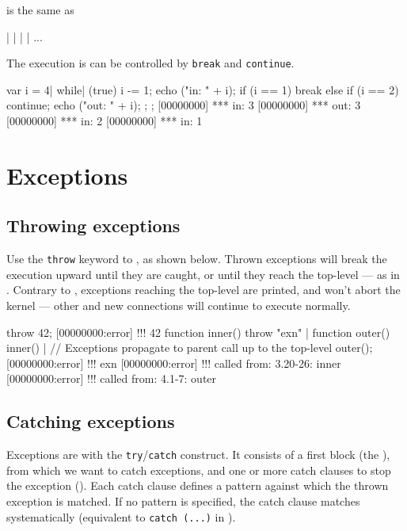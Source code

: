 \noindent
is the same as

\begin{urbiunchecked}
 |  |  |  | ...
\end{urbiunchecked}

The execution is can be controlled by \lstinline|break| and
\lstinline|continue|.

\begin{urbiscript}
{
  var i = 4|
  while| (true)
  {
    i -= 1;
    echo ("in: " + i);
    if (i == 1)
      break
    else if (i == 2)
      continue;
    echo ("out: " + i);
  };
};
[00000000] *** in: 3
[00000000] *** out: 3
[00000000] *** in: 2
[00000000] *** in: 1
\end{urbiscript}


\section{Exceptions}
\label{sec:lang:except}
\subsection{Throwing exceptions}

Use the \lstinline|throw| keyword to , as shown below. Thrown exceptions will
break the execution upward until they are caught, or until they reach
the top-level --- as in \Cxx.  Contrary to \Cxx, exceptions reaching
the top-level are printed, and won't abort the kernel --- other and new
connections will continue to execute normally.

\begin{urbiscript}
throw 42;
[00000000:error] !!! 42
function inner() { throw "exn" } |
function outer() { inner() }|
// Exceptions propagate to parent call up to the top-level
outer();
[00000000:error] !!! exn
[00000000:error] !!!    called from: 3.20-26: inner
[00000000:error] !!!    called from: 4.1-7: outer
\end{urbiscript}

\subsection{Catching exceptions}

Exceptions are  with the
\lstinline|try|/\lstinline|catch| construct. It consists of a first
block (the ), from which we want to catch exceptions,
and one or more catch clauses to stop the exception
(). Each catch clause defines a pattern against
which the thrown exception is matched. If no pattern is specified, the
catch clause matches systematically (equivalent to
\lstinline|catch (...)| in \Cxx).

